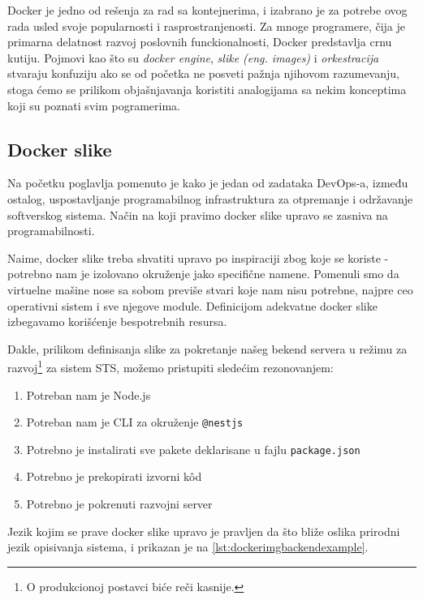 \documentclass[12pt,oneside]{memoir}
\begin{document}
Docker je jedno od rešenja za rad sa kontejnerima, i izabrano je za potrebe ovog rada usled svoje popularnosti i rasprostranjenosti. Za mnoge programere, čija je primarna delatnost razvoj poslovnih funckionalnosti, Docker predstavlja crnu kutiju. Pojmovi kao što su \textit{docker engine}, \textit{slike (eng. images)} i \textit{orkestracija} stvaraju konfuziju ako se od početka ne posveti pažnja njihovom razumevanju, stoga ćemo se prilikom objašnjavanja koristiti analogijama sa nekim konceptima koji su poznati svim pogramerima.

\subsection{Docker slike}

Na početku poglavlja pomenuto je kako je jedan od zadataka DevOps-a, između ostalog, uspostavljanje programabilnog infrastruktura za otpremanje i održavanje softverskog sistema. Način na koji pravimo docker slike upravo se zasniva na programabilnosti. 

Naime, docker slike treba shvatiti upravo po inspiraciji zbog koje se koriste - potrebno nam je izolovano okruženje jako specifične namene. Pomenuli smo da virtuelne mašine nose sa sobom previše stvari koje nam nisu potrebne, najpre ceo operativni sistem i sve njegove module. Definicijom adekvatne docker slike izbegavamo korišćenje bespotrebnih resursa. 

Dakle, prilikom definisanja slike za pokretanje našeg bekend servera u režimu za razvoj\footnote{O produkcionoj postavci biće reči kasnije.} za sistem STS, možemo pristupiti sledećim rezonovanjem:

\begin{enumerate}
    \item Potreban nam je Node.js
    \item Potreban nam je CLI za okruženje \verb|@nestjs|
    \item Potrebno je instalirati sve pakete deklarisane u fajlu \verb|package.json|
    \item Potrebno je prekopirati izvorni k\^{o}d
    \item Potrebno je pokrenuti razvojni server
\end{enumerate}

Jezik kojim se prave docker slike upravo je pravljen da što bliže oslika prirodni jezik opisivanja sistema, i prikazan je na \ref{lst:dockerimgbackendexample}.
\end{document}
